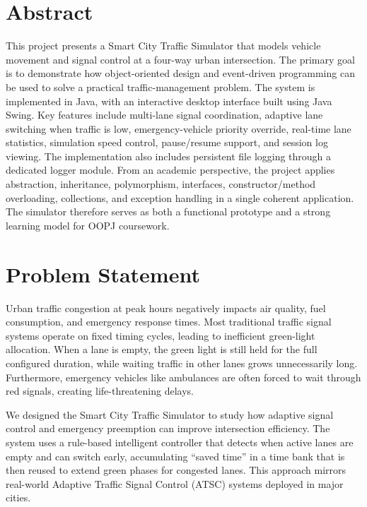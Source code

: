 \documentclass[12pt,a4paper]{article}
\begin{document}
\section*{Abstract}
This project presents a Smart City Traffic Simulator that models vehicle movement and signal control at a four-way urban intersection. The primary goal is to demonstrate how object-oriented design and event-driven programming can be used to solve a practical traffic-management problem. The system is implemented in Java, with an interactive desktop interface built using Java Swing. Key features include multi-lane signal coordination, adaptive lane switching when traffic is low, emergency-vehicle priority override, real-time lane statistics, simulation speed control, pause/resume support, and session log viewing. The implementation also includes persistent file logging through a dedicated logger module. From an academic perspective, the project applies abstraction, inheritance, polymorphism, interfaces, constructor/method overloading, collections, and exception handling in a single coherent application. The simulator therefore serves as both a functional prototype and a strong learning model for OOPJ coursework.

\newpage

\section{Problem Statement}
Urban traffic congestion at peak hours negatively impacts air quality, fuel consumption, and emergency response times. Most traditional traffic signal systems operate on fixed timing cycles, leading to inefficient green-light allocation. When a lane is empty, the green light is still held for the full configured duration, while waiting traffic in other lanes grows unnecessarily long. Furthermore, emergency vehicles like ambulances are often forced to wait through red signals, creating life-threatening delays.

We designed the Smart City Traffic Simulator to study how adaptive signal control and emergency preemption can improve intersection efficiency. The system uses a rule-based intelligent controller that detects when active lanes are empty and can switch early, accumulating ``saved time'' in a time bank that is then reused to extend green phases for congested lanes. This approach mirrors real-world Adaptive Traffic Signal Control (ATSC) systems deployed in major cities.
\end{document}
